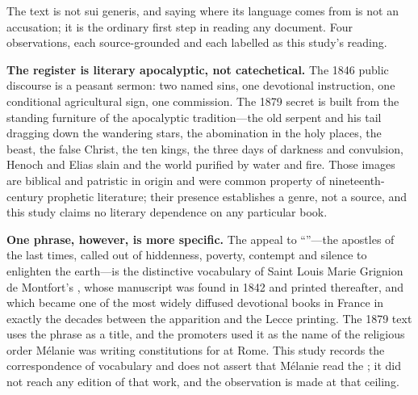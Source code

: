 The text is not sui generis, and saying where its language comes
from is not an accusation; it is the ordinary first step in reading
any document. Four observations, each source-grounded and each
labelled as this study's reading.

\textbf{The register is literary apocalyptic, not catechetical.} The
1846 public discourse is a peasant sermon: two named sins, one
devotional instruction, one conditional agricultural sign, one
commission. The 1879 secret is built from the standing furniture of
the apocalyptic tradition---the old serpent and his tail dragging
down the wandering stars, the abomination in the holy places, the
beast, the false Christ, the ten kings, the three days of darkness
and convulsion, Henoch and Elias slain and the world purified by
water and fire. Those images are biblical and patristic in origin
and were common property of nineteenth-century prophetic literature;
their presence establishes a genre, not a source, and this study
claims no literary dependence on any particular book.

\textbf{One phrase, however, is more specific.} The appeal to
``''---the apostles of the last
times, called out of hiddenness, poverty, contempt and silence to
enlighten the earth---is the distinctive vocabulary of Saint Louis
Marie Grignion de Montfort's , whose manuscript was found in 1842 and printed
thereafter, and which became one of the most widely diffused
devotional books in France in exactly the decades between the
apparition and the Lecce printing. The 1879 text uses the phrase as
a title, and the promoters used it as the name of the religious
order Mélanie was writing constitutions for at Rome. This study
records the correspondence of vocabulary and does not assert that
Mélanie read the ; it did not reach any edition of that
work, and the observation is made at that ceiling.

